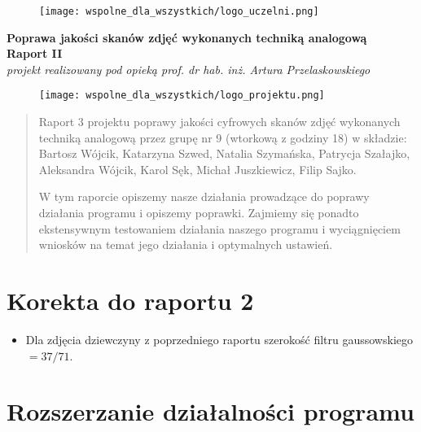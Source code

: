 \documentclass[]{mwart}
\begin{document}
\thispagestyle{empty}

\begin{figure}[h]
    \centering
    \texttt{[image: wspolne\_dla\_wszystkich/logo\_uczelni.png]}
\end{figure}


\begin{center}
    {\LARGE \textbf{Poprawa jakości skanów zdjęć wykonanych techniką analogową
        }} \\[0.3cm]
    {\large \textbf{Raport II}} \\[0.2cm]
    \textit{projekt realizowany pod opieką prof. dr hab. inż. Artura Przelaskowskiego}

\end{center}

\begin{figure}[h]
    \centering
    \texttt{[image: wspolne\_dla\_wszystkich/logo\_projektu.png]}
\end{figure}

\vfill
\begin{abstract}
    Raport 3 projektu poprawy jakości cyfrowych skanów zdjęć wykonanych techniką analogową przez grupę nr 9 (wtorkową z godziny 18)
    w składzie:  Bartosz Wójcik, Katarzyna Szwed, Natalia Szymańska,
    Patrycja Szałajko, Aleksandra Wójcik, Karol Sęk, Michał Juszkiewicz, Filip Sajko.

    W tym raporcie opiszemy nasze działania prowadzące do poprawy działania programu i opiszemy poprawki.
    Zajmiemy się ponadto ekstensywnym testowaniem działania naszego programu i wyciągnięciem wniosków na temat jego działania i optymalnych ustawień.
\end{abstract}

\newpage
\tableofcontents{}

\newpage

\section{Korekta do raportu 2}
\begin{itemize}
    \item Dla zdjęcia dziewczyny z poprzedniego raportu szerokość filtru gaussowskiego $ =  37/71$.
\end{itemize}


\section{Rozszerzanie działalności programu}
\end{document}
